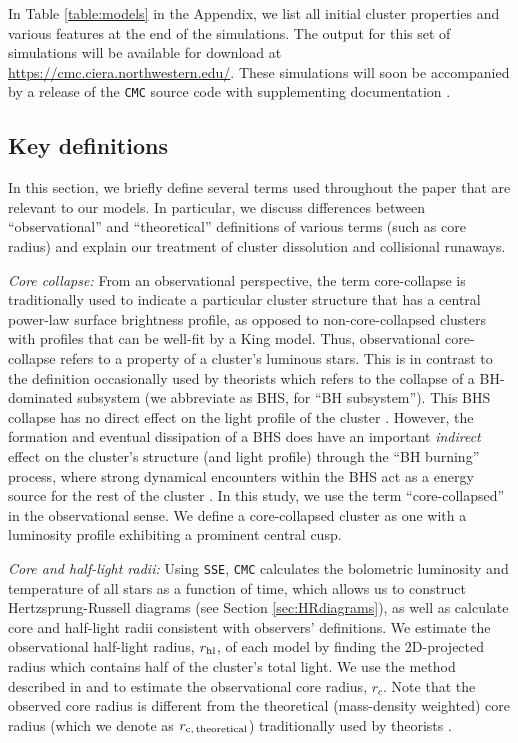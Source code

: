 \documentclass[twocolumn,tighten]{aastex63}
\begin{document}
In Table \ref{table:models} in the Appendix, we list all initial cluster properties and various features at the end of the simulations. The output for this set of simulations will be available for download at \url{https://cmc.ciera.northwestern.edu/}. These simulations will soon be accompanied by a release of the \texttt{CMC} source code with supplementing documentation \citep{Rodriguez2019c}.


\subsection{Key definitions}
\label{sec:definitions}

In this section, we briefly define several terms used throughout the paper that are relevant to our models. In particular, we discuss differences between ``observational'' and ``theoretical'' definitions of various terms (such as core radius) and explain our treatment of cluster dissolution and collisional runaways.

\textit{Core collapse:} From an observational perspective, the term core-collapse is traditionally used to indicate a particular cluster structure that has a central power-law surface brightness profile, as opposed to non-core-collapsed clusters with profiles that can be well-fit by a King model. Thus, observational core-collapse refers to a property of a cluster's luminous stars. This is in contrast to the definition occasionally used by theorists which refers to the collapse of a BH-dominated subsystem (we abbreviate as BHS, for ``BH subsystem''). This BHS collapse has no direct effect on the light profile of the cluster \citep{Chatterjee2017a}. However, the formation and eventual dissipation of a BHS does have an important \textit{indirect} effect on the cluster's structure (and light profile) through the ``BH burning'' process, where strong dynamical encounters within the BHS act as a energy source for the rest of the cluster \citep[see][for review]{Kremer2019d}. In this study, we use the term ``core-collapsed'' in the observational sense. We define a core-collapsed cluster as one with a luminosity profile exhibiting a prominent central cusp.

\textit{Core and half-light radii:} Using \texttt{SSE}, \texttt{CMC} calculates the bolometric luminosity and temperature of all stars as a function of time, which allows us to construct Hertzsprung-Russell diagrams (see Section \ref{sec:HRdiagrams}), as well as calculate core and half-light radii consistent with observers' definitions. We estimate the observational half-light radius, $r_{\rm{hl}}$, of each model by finding the 2D-projected radius which contains half of the cluster's total light. We use the method described in \citet{Morscher2015} and \citet{Chatterjee2017a} to estimate the observational core radius, $r_c$. Note that the observed core radius is different from the theoretical (mass-density weighted) core radius (which we denote as $r_{\rm{c,\,theoretical}}$) 
traditionally used by theorists \citep{Casertano1985}.
\end{document}
